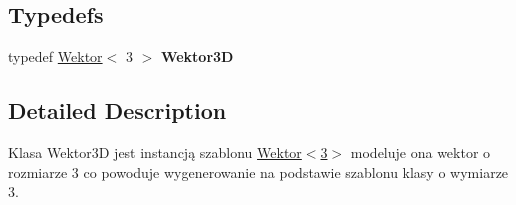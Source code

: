 \subsection*{Typedefs}
\begin{DoxyCompactItemize}
\item 
\mbox{\label{Wektor3D_8hh_ac353a272b38b4ad342f7181ad7bdb91a}} 
typedef \hyperlink{classWektor}{Wektor}$<$ 3 $>$ {\bfseries Wektor3D}
\end{DoxyCompactItemize}


\subsection{Detailed Description}
Klasa Wektor3D jest instancją szablonu \hyperlink{classWektor}{Wektor$<$3$>$} modeluje ona wektor o rozmiarze 3 co powoduje wygenerowanie na podstawie szablonu klasy o wymiarze 3. 

